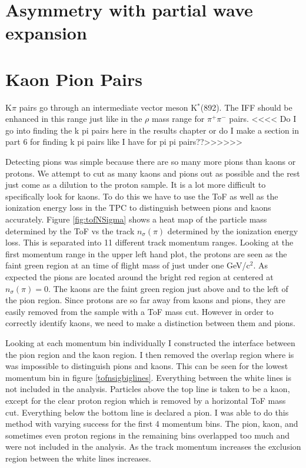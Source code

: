 \documentclass[abstract = on,listof=totoc, bibliography=totoc]{scrreprt}
\newcommand{\pip}{\pi^+}
\newcommand{\pim}{\pi^-}
\newcommand{\pair}{$\pip\pim$ }
\newcommand{\nsigpi}{n_\sigma(\pi)}
\begin{document}
\section{Asymmetry with partial wave expansion}

\section{Kaon Pion Pairs}


K$\pi$ pairs go through an intermediate vector meson K$^*$(892). The IFF should be enhanced in this range just like in the $\rho$ mass range for \pair pairs. <<<< Do I go into finding the k pi pairs here in the results chapter or do I make a section in part 6 for finding k pi pairs like I have for pi pi pairs??>>>>>>




Detecting pions was simple because there are so many more pions than kaons or protons. We attempt to cut as many kaons and pions out as possible and the rest just come as a dilution to the proton sample. It is a lot more difficult to specifically look for kaons. To do this we have to use the ToF as well as the ionization energy loss in the TPC to distinguish between pions and kaons accurately. Figure \ref{fig:tofNSigma} shows a heat map of the particle mass determined by the ToF vs the track $\nsigpi$ determined by the ionization energy loss. This is separated into 11 different track momentum ranges. Looking at the first momentum range in the upper left hand plot, the protons are seen as the faint green region at an time of flight mass of just under one GeV/c$^2$. As expected the pions are located around the bright red region at centered at $\nsigpi = 0$. The kaons are the faint green region just above and to the left of the pion region. Since protons are so far away from kaons and pions, they are easily removed from the sample with a ToF mass cut. However in order to correctly identify kaons, we need to make a distinction between them and pions. 

Looking at each momentum bin individually I constructed the interface between the pion region and the kaon region. I then removed the overlap region where is was impossible to distinguish pions and kaons. This can be seen for the lowest momentum bin in figure \ref{tofnsigbiglines}. Everything between the white lines is not included in the analysis. Particles above the top line is taken to be a kaon, except for the clear proton region which is removed by a horizontal ToF mass cut. Everything below the bottom line is declared a pion. I was able to do this method with varying success for the first 4 momentum bins. The pion, kaon, and sometimes even proton regions in the remaining bins overlapped too much and were not included in the analysis. As the track momentum increases the exclusion region between the white lines increases.    
\end{document}
